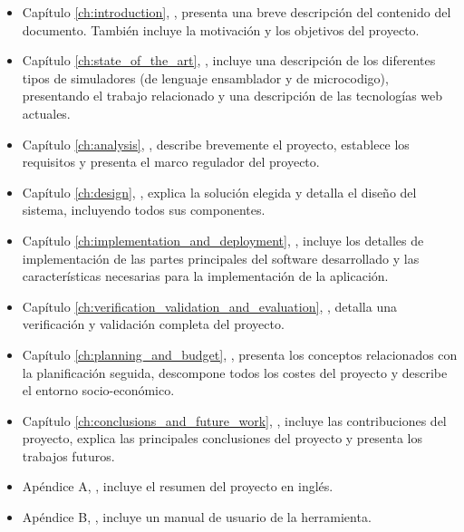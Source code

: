 \begin{itemize}

\item Capítulo \ref{ch:introduction}, \textit{}, presenta una breve descripción del contenido del documento. También incluye la motivación y los objetivos del proyecto.

\item Capítulo \ref{ch:state_of_the_art}, \textit{}, incluye una descripción de los diferentes tipos de simuladores (de lenguaje \gls{ensamblador} y de \gls{microcodigo}), presentando el trabajo relacionado y una descripción de las tecnologías web actuales.

\item Capítulo \ref{ch:analysis}, \textit{}, describe brevemente el proyecto, establece los requisitos y presenta el marco regulador del proyecto.

\item Capítulo \ref{ch:design}, \textit{}, explica la solución elegida y detalla el diseño del sistema, incluyendo todos sus componentes.

\item Capítulo \ref{ch:implementation_and_deployment}, \textit{}, incluye los detalles de implementación de las partes principales del \gls{software} desarrollado y las características necesarias para la implementación de la aplicación.

\item Capítulo \ref{ch:verification_validation_and_evaluation}, \textit{}, detalla una verificación y validación completa del proyecto.

\item Capítulo \ref{ch:planning_and_budget}, \textit{}, presenta los conceptos relacionados con la planificación seguida, descompone todos los costes del proyecto y describe el entorno socio-económico.

\item Capítulo \ref{ch:conclusions_and_future_work}, \textit{}, incluye las contribuciones del proyecto, explica las principales conclusiones del proyecto y presenta los trabajos futuros.

\item Apéndice A, \textit{}, incluye el resumen del proyecto en inglés.

\item Apéndice B, \textit{}, incluye un manual de usuario de la herramienta.

\end{itemize}


